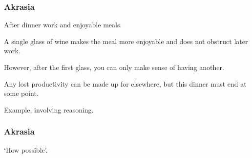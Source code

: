 \documentclass[noamssymb,
]{beamer} %
\newcommand{\hozlinedash}[0]{%
  \noindent\hdashrule[0.5ex][c]{\textwidth}{.1pt}{2.5pt}
}
\begin{document}
\begin{frame}
  \frametitle{Akrasia}

  {\rmfamily
    After dinner work and enjoyable meals.

    A single glass of wine makes the meal more enjoyable and does not obstruct later work.

    However, after the first glass, you can only make sense of having another.

    Any lost productivity can be made up for elsewhere, but this dinner must end at some point.
  }

  \hozlinedash

  Example, involving reasoning.
\end{frame}

\begin{frame}
  \frametitle{Akrasia}

  `How possible'.
\end{frame}
\end{document}
